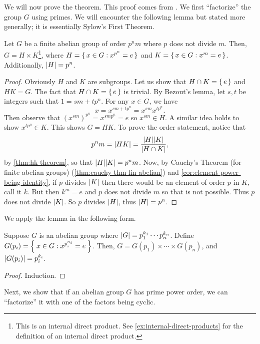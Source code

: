 \documentclass[./main.tex]{subfiles}
\begin{document}
We will now prove the theorem. This proof comes from
\autocite[Ch~11]{Gallian_2020}. We first ``factorize'' the group $G$ using
primes. We will encounter the following lemma but stated more generally; it is
essentially Sylow's First Theorem.
\begin{lemma}
    Let $G$ be a finite abelian group of order $p^n m$ where $p$ does not divide
    $m$. Then, $G = H \times K$\footnote{This is an internal direct product. See
    \cref{ex:internal-direct-products} for the definition of an internal direct
    product.}, where $H = \set{x \in G: x^{p^n} = e}$ and $K = \set{x \in G: x^m
    = e}$. Additionally, $\abs H = p^n$.
\end{lemma}
\begin{proof}
    Obviously $H$ and $K$ are subgroups. Let us show that $H \cap K = \set{e}$
    and $HK = G$. The fact that $H \cap K = \set{e}$ is trivial. By Bezout's
    lemma, let $s, t$ be integers such that $1 = sm + tp^n$. For any $x \in G$,
    we have
    \[
        x = x^{sm + tp^n} = x^{sm} x^{tp^n}.
    \]
    Then observe that $(x^{sm})^{p^n} = x^{sm p^n} = e$ so $x^{sm} \in H$. A
    similar idea holds to show $x^{tp^n} \in K$. This shows $G = HK$. To prove
    the order statement, notice that
    \[
        p^n m = \abs{HK} = \frac{\abs{H} \abs K}{\abs{H \cap K}},
    \]
    by \cref{thm:hk-theorem}, so that $\abs{H} \abs K = p^n m$. Now, by Cauchy's
    Theorem (for finite abelian groups) (\cref{thm:cauchy-thm-fin-abelian}) and
    \cref{cor:element-power-being-identity}, if $p$ divides $\abs K$ then there
    would be an element of order $p$ in $K$, call it $k$. But then $k^m  = e$
    and $p$ does not divide $m$ so that is not possible. Thus $p$ does not
    divide $\abs K$. So $p$ divides $\abs H$, thus $\abs{H} = p^n$.
\end{proof}

We apply the lemma in the following form.
\begin{corollary}
    Suppose $G$ is an abelian group where $\abs{G} = p_1^{k_1} \cdots
    p_n^{k_n}$. Define $G(p_i) = \Set{x \in G : x^{p_i^{n_i}} = e}$. Then, $G =
    G(p_1) \times \cdots \times G(p_n)$, and $\abs{G(p_i)} = p_i^{k_i}$.
\end{corollary}
\begin{proof}
    Induction.
\end{proof}

Next, we show that if an abelian group $G$ has prime power order, we can
``factorize'' it with one of the factors being cyclic.
\end{document}
